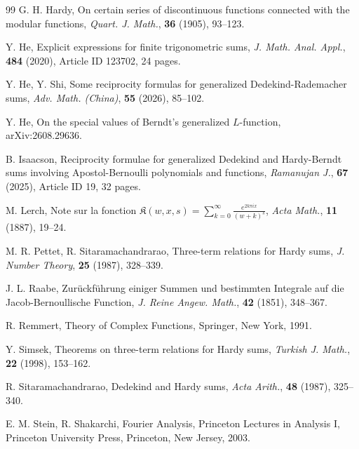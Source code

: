 \documentclass[reqno]{amsart}
\numberwithin{equation}{section}
\begin{document}
\begin{thebibliography}{99}
 G. H. Hardy, On certain series of discontinuous functions connected with the modular functions, \emph{Quart. J. Math.}, \textbf{36} (1905), 93--123.

 Y. He, Explicit expressions for finite trigonometric sums, \emph{J. Math. Anal. Appl.}, \textbf{484} (2020), Article ID 123702, 24 pages.

 Y. He, Y. Shi, Some reciprocity formulas for generalized Dedekind-Rademacher sums, \emph{Adv. Math. (China)}, \textbf{55} (2026), 85--102.

 Y. He, On the special values of Berndt's generalized $L$-function, arXiv:2608.29636.

 B. Isaacson, Reciprocity formulae for generalized Dedekind and Hardy-Berndt sums involving Apostol-Bernoulli polynomials and functions, \emph{Ramanujan J.}, \textbf{67} (2025), Article ID 19, 32 pages.

 M. Lerch, Note sur la fonction $\mathfrak{K}(w,x,s)=\sum_{k=0}^{\infty} \frac{e^{2k\pi i x}}{(w+k)^s}$, \emph{Acta Math.}, \textbf{11} (1887), 19--24.

 M. R. Pettet, R. Sitaramachandrarao, Three-term relations for Hardy sums, \emph{J. Number Theory}, \textbf{25} (1987), 328--339.

 J. L. Raabe, Zur\"{u}ckf\"{u}hrung einiger Summen und bestimmten Integrale auf die Jacob-Bernoullische
Function, \emph{J. Reine Angew. Math.}, \textbf{42} (1851), 348--367.

 R. Remmert, Theory of Complex Functions, Springer, New York, 1991.

 Y. Simsek, Theorems on three-term relations for Hardy sums, \emph{Turkish J. Math.}, \textbf{22} (1998), 153--162.

 R. Sitaramachandrarao, Dedekind and Hardy sums, \emph{Acta Arith.}, \textbf{48} (1987), 325--340.

 E. M. Stein, R. Shakarchi, Fourier Analysis, Princeton Lectures in Analysis I, Princeton University Press, Princeton, New Jersey, 2003.

\end{thebibliography}
\end{document}
